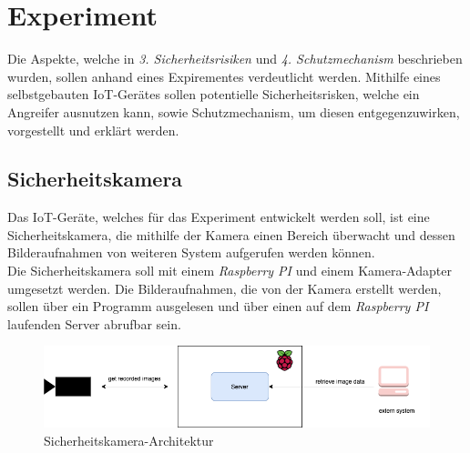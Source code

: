 \section{Experiment}
Die Aspekte, welche in \textit{3. Sicherheitsrisiken} und \textit{4. Schutzmechanism} beschrieben wurden, sollen anhand
eines Expirementes verdeutlicht werden. Mithilfe eines selbstgebauten IoT-Gerätes sollen potentielle Sicherheitsrisken, 
welche ein Angreifer ausnutzen kann, sowie Schutzmechanism, um diesen entgegenzuwirken, vorgestellt und erklärt werden.

\subsection{Sicherheitskamera}
Das IoT-Geräte, welches für das Experiment entwickelt werden soll, ist eine Sicherheitskamera, die mithilfe der Kamera
einen Bereich überwacht und dessen Bilderaufnahmen von  weiteren System aufgerufen werden können. \\

Die Sicherheitskamera soll mit einem \textit{Raspberry PI} und einem Kamera-Adapter umgesetzt werden.
Die Bilderaufnahmen, die von der Kamera erstellt werden, sollen über ein Programm ausgelesen und über
einen auf dem \textit{Raspberry PI} laufenden Server abrufbar sein. \\

	\begin{figure}[h]
		\centering
		\includegraphics[width=145mm]{images/raspberrypi.png}
		\caption{Sicherheitskamera-Architektur}
		\label{fig:arch-raspberrypi}
	\end{figure}
